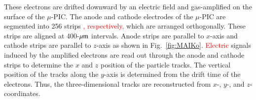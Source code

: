 \documentclass{jps-cp}
\begin{document}
These electrons are drifted downward by an electric field and
gas-amplified on the surface of the $\mu$-PIC.
%
The anode and cathode electrodes of the $\mu$-PIC are segmented into 256 strips 
\textcolor{red}{, respectively,} which are arranged orthogonally.
These strips are aligned at 400-$\rm{\mu m}$ intervals.
Anode strips are parallel to $x$-axis and %
cathode strips are parallel to $z$-axis as shown in Fig.~\ref{fig:MAIKo}. %
\textcolor{red}{Electric} signals induced by the amplified electrons are read out through the anode and 
cathode strips to determine the $x$ and $z$ position of the particle tracks.
The vertical position of the tracks along the $y$-axis is determined 
from the drift time of the electrons.
Thus, the three-dimensional tracks are reconstructed from $x$-, $y$-, and $z$-coordinates.
\end{document}
